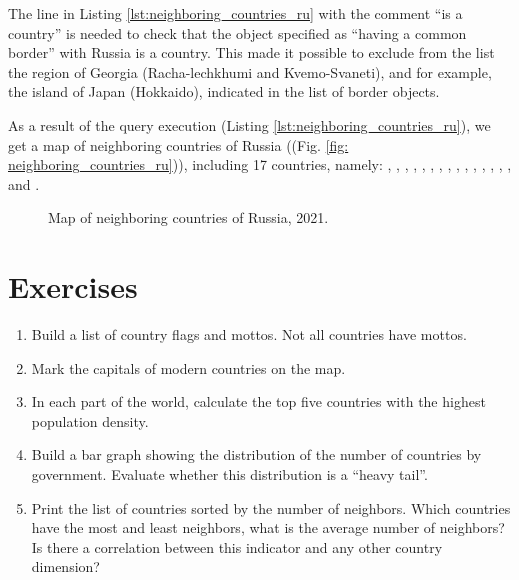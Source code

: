 The line in Listing \ref{lst:neighboring_countries_ru} with the comment ``is a country'' is needed to check that the object specified as ``having a common border'' with Russia is a country. This made it possible to exclude from the list the region of Georgia (Racha-lechkhumi and Kvemo-Svaneti), and for example, the island of Japan (Hokkaido), indicated in the list of border objects.

As a result of the query execution (Listing \ref{lst:neighboring_countries_ru}), we get a map of neighboring countries of Russia ((Fig. \ref{fig: neighboring_countries_ru})), including 17 countries, namely: , , , , , , , , , , , , , , ,  and .


\begin{figure*}
	{
		\setlength{\fboxsep}{0pt}%
		\setlength{\fboxrule}{1pt}%
	}
	\caption{Map of neighboring countries of Russia, 2021.
	}%
	\label{fig:neighboring_countries_ru}%
\end{figure*}
\section{Exercises}

\begin{enumerate}
\item Build a list of country flags and mottos. Not all countries have mottos.
\item Mark the capitals of modern countries on the map.
\item In each part of the world, calculate the top five countries with the highest population density.
\item Build a bar graph showing the distribution of the number of countries by government. Evaluate whether this distribution is a ``heavy tail''\protect\footnotemark.
\item Print the list of countries sorted by the number of neighbors. Which countries have the most and least neighbors, what is the average number of neighbors? Is there a correlation between this indicator and any other country dimension?
\end{enumerate}